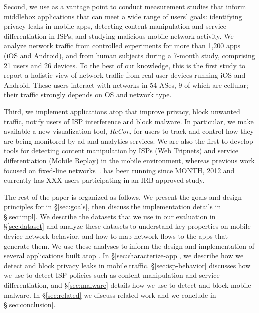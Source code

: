 Second, we use \meddle as a vantage point to conduct measurement studies that inform 
middlebox applications that can meet a wide range of users' goals: identifying privacy leaks in mobile apps, detecting content 
manipulation and service differentiation in ISPs, and studying malicious mobile network activity. We analyze network traffic from controlled experiments for more than 1,200 apps (iOS and Android), 
and from human subjects during a 7-month study, comprising 21 users and 26 devices. To the best of our knowledge, this is the first study to report a holistic 
view of network traffic from real user devices running iOS and Android. These users interact with networks in 54 ASes, 9 of which are	 cellular; their traffic 
strongly depends on OS and network type.


Third, we implement applications atop \meddle that improve 
privacy, block unwanted traffic, notify users of ISP interference and block malware. 
In particular, we make available a new visualization tool, \emph{ReCon}, for users to track and control how 
they are being monitored by ad and analytics services. 
 We are also the first to develop tools for detecting content manipulation by ISPs (Web Tripnets) and 
 service differentiation (Mobile Replay) in the mobile environment, whereas previous work focused on 
 fixed-line networks~\cite{tripnets,glasnost}. 
\meddle has been running since 
MONTH, 2012 and currently has XXX users participating in an IRB-approved study. 






The rest of the paper is organized as follows. We present the goals and design principles for \meddle in \S\ref{sec:goals}, then 
discuss the implementation details in \S\ref{sec:impl}. We describe the datasets that we use in our evaluation in \S\ref{sec:dataset} and 
analyze these datasets to understand key properties on mobile device network behavior, and how to map network flows to the 
apps that generate them. We use these analyses to inform the design and implementation of several applications built atop \meddle. 
In \S\ref{sec:characterize-app}, we describe how we detect and block privacy leaks in mobile traffic. \S\ref{sec:isp-behavior} discusses 
how we use \meddle to detect ISP policies such as content manipulation and service differentiation, and \S\ref{sec:malware} details 
how we use \meddle to detect and block mobile malware. In \S\ref{sec:related} we discuss related work and we conclude in \S\ref{sec:conclusion}.

